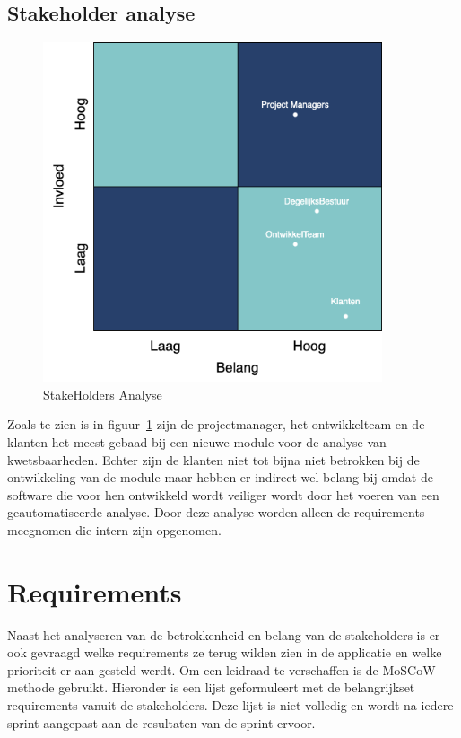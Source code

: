 \subsection{Stakeholder analyse}\label{subsec:stakeholder-analyse}
\begin{figure}[H]
\myfloatalign
\includegraphics[width=10cm]{gfx/stakeholderanalyse}
\caption{StakeHolders Analyse}
\label{fig:StakeholderAnalyse}
\end{figure}
Zoals te zien is in figuur~\ref{fig:StakeholderAnalyse} zijn de projectmanager, het ontwikkelteam en de klanten het meest gebaad bij een nieuwe module voor de analyse van kwetsbaarheden.
Echter zijn de klanten niet tot bijna niet betrokken bij de ontwikkeling van de module maar hebben er indirect wel belang bij omdat de software die voor hen ontwikkeld wordt veiliger wordt door het voeren van een geautomatiseerde analyse.
Door deze analyse worden alleen de requirements meegnomen die intern zijn opgenomen.
\section{Requirements}\label{sec:requirements}
Naast het analyseren van de betrokkenheid en belang van de stakeholders is er ook gevraagd welke requirements ze terug wilden zien in de applicatie en welke prioriteit er aan gesteld werdt.
Om een leidraad te verschaffen is de MoSCoW-methode gebruikt.
Hieronder is een lijst geformuleert met de belangrijkset requirements vanuit de stakeholders.
Deze lijst is niet volledig en wordt na iedere sprint aangepast aan de resultaten van de sprint ervoor.

